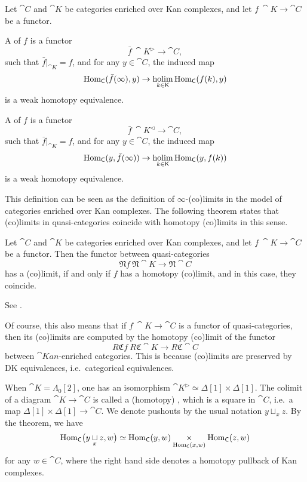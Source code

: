 \begin{definition}
    Let $\cat C$ and $\cat K$ be categories enriched over Kan complexes,
    and let $f\:\cat K\to\cat C$ be a functor.
    \begin{itms}
        \item A  of $f$ is a functor 
        \[ \bar f\:\cat K^\vartriangleright\to\cat C, \]
        such that $\bar f|_{\cat K}=f$, and for any $y\in\cat C$, the induced map 
        \[ \operatorname{Hom}_{\mathsf{C}}(\bar f(\infty),y)\to\mathop{\operatorname{holim}}\limits_{k\in\mathsf{K}}\operatorname{Hom}_{\mathsf{C}}(f(k),y) \]
        is a weak homotopy equivalence.

        \item A  of $f$ is a functor 
        \[ \bar f\:\cat K^\vartriangleleft\to\cat C, \]
        such that $\bar f|_{\cat K}=f$, and for any $y\in\cat C$, the induced map 
        \[ \operatorname{Hom}_{\mathsf{C}}(y,\bar f(\infty))\to\mathop{\operatorname{holim}}\limits_{k\in\mathsf{K}}\operatorname{Hom}_{\mathsf{C}}(y,f(k)) \]
        is a weak homotopy equivalence.
    \end{itms}
\end{definition}

This definition can be seen as the definition of $\infty$-(co)limits 
in the model of categories enriched over Kan complexes.
The following theorem states that
(co)limits in quasi-categories coincide with homotopy (co)limits in this sense.

\begin{theorem}
    Let $\cat C$ and $\cat K$ be categories enriched over Kan complexes,
    and let $f\:\cat K\to\cat C$ be a functor.
    Then the functor between quasi-categories
    \[ \mathfrak Nf\:\mathfrak N\cat K\to\mathfrak N\cat C \]
    has a (co)limit,
    if and only if $f$ has a homotopy (co)limit,
    and in this case, they coincide.
\end{theorem}

See \cite[Theorem~4.2.4.1]{htt}.

Of course, this also means that if $f\:\cat K\to\cat C$
is a functor of quasi-categories, then its (co)limits are computed by
the homotopy (co)limit of the functor
\[ R\mathfrak Cf\:R\mathfrak C\cat K\to R\mathfrak C\cat C \]
between $\cat{Kan}$-enriched categories.
This is because (co)limits are preserved by DK equivalences,
i.e.\ categorical equivalences.

\begin{example}
    When $\cat K=\Lambda_0[2]$, one has an isomorphism
    $\cat K^\vartriangleright\simeq\Delta[1]\times\Delta[1]$.
    The colimit of a diagram $\cat K\to\cat C$ is called a (homotopy) ,
    which is a square in $\cat C$, i.e.\ a map $\Delta[1]\times\Delta[1]\to\cat C$.
    We denote pushouts by the usual notation $y\sqcup_xz$.
    By the theorem, we have 
    \[ \operatorname{Hom}_{\mathsf{C}}\bigl(y\underset{x}{\sqcup}z,w\bigr)\simeq
    \operatorname{Hom}_{\mathsf{C}}(y,w)\underset{\operatorname{Hom}_{\mathsf{C}}(x,w)}{\times}\operatorname{Hom}_{\mathsf{C}}(z,w) \]
    for any $w\in\cat C$,
    where the right hand side denotes a homotopy pullback of Kan complexes. 
    \varqed
\end{example}

